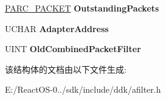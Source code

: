 \begin{DoxyCompactItemize}
\hyperlink{struct___a_r_c___p_a_c_k_e_t}{P\+A\+R\+C\+\_\+\+P\+A\+C\+K\+ET} {\bfseries Outstanding\+Packets}
\item 
\mbox{\label{struct___a_r_c___f_i_l_t_e_r_a452ca67c3408307a8a1e4985ae932200}} 
U\+C\+H\+AR {\bfseries Adapter\+Address}
\item 
\mbox{\label{struct___a_r_c___f_i_l_t_e_r_a4abdf8e2df2a9dc6559295be648b4601}} 
U\+I\+NT {\bfseries Old\+Combined\+Packet\+Filter}
\end{DoxyCompactItemize}


该结构体的文档由以下文件生成\+:\begin{DoxyCompactItemize}
\item 
E\+:/\+React\+O\+S-\/0../sdk/include/ddk/afilter.\+h\end{DoxyCompactItemize}
